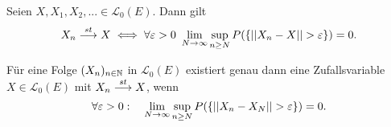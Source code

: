 \begin{theorem}
    Seien $X, X_1,X_2,... \in \mathcal{L}_0(E)$. Dann gilt
    \begin{align*}
        X_n \overset{st}{\longrightarrow} X \iff \forall \varepsilon > 0 \ \lim_{N \to \infty}\sup_{n \geq N}P(\{\lvert\lvert X_n - X \rvert\rvert > \varepsilon \}) = 0.
    \end{align*}
\end{theorem}

\begin{theorem}
    Für eine Folge $(X_n)_{n \in \mathbb{N}}$ in $\mathcal{L}_0(E)$ existiert genau dann eine Zufallsvariable $X \in \mathcal{L}_0(E)$ mit \mbox{$X_n \overset{st}{\longrightarrow} X$}, wenn
    $$
        \forall \varepsilon > 0 : \quad \lim_{N \to \infty}\sup_{n\geq N}P(\{\lvert\lvert X_n - X_N \rvert\rvert > \varepsilon \}) = 0. 
    $$
\end{theorem}


